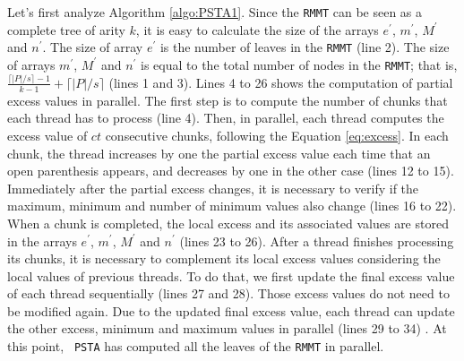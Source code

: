 Let's first analyze Algorithm \ref{algo:PSTA1}. Since the {\tt RMMT}
can be seen as a complete tree of arity $k$, it is easy to calculate
the size of the arrays $e^{\prime}$, $m^{\prime}$, $M^{\prime}$ and
$n^{\prime}$. The size of array $e^{\prime}$ is the number of leaves
in the {\tt RMMT} (line 2). The size of arrays $m^{\prime}$,
$M^{\prime}$ and $n^{\prime}$ is equal to the total number of nodes in
the {\tt RMMT}; that is, $\frac{\lceil |P|/s \rceil-1}{k-1} + \lceil
|P|/s \rceil$ (lines 1 and 3). Lines 4 to 26 shows the computation of
partial excess values in parallel. The first step is to compute the
number of chunks that each thread has to process (line 4). Then, in
parallel, each thread computes the excess value of $ct$ consecutive
chunks, following the Equation \ref{eq:excess}. In each chunk, the
thread increases by one the partial excess value each time that an
open parenthesis appears, and decreases by one in the other case
(lines 12 to 15). Immediately after the partial excess changes, it is
necessary to verify if the maximum, minimum and number of minimum
values also change (lines 16 to 22). When a chunk is completed, the
local excess and its associated values are stored in the arrays
$e^{\prime}$, $m^{\prime}$, $M^{\prime}$ and $n^{\prime}$ (lines 23 to
26). After a thread finishes processing its chunks, it is necessary to
complement its local excess values considering the local values of
previous threads. To do that, we first update the final excess value
of each thread sequentially (lines 27 and 28). Those excess values do
not need to be modified again. Due to the updated final excess value,
each thread can update the other excess, minimum and maximum values in
parallel (lines 29 to 34) . At this point, {\tt
  PSTA} has computed all the leaves of the {\tt RMMT} in parallel.

